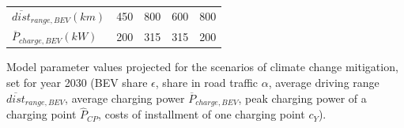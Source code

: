 \documentclass[journal,article,submit,pdftex,moreauthors]{Definitions/mdpi}
\begin{document}
\begin{table}[H]
\begin{tabularx}{\textwidth}{lCCCC}
    $\overline{dist}_{range, BEV} (km)$          & 450                                                          & 800                                                       & 600                                                           & 800                                                             \\
    $\overline{P}_{charge, BEV} (kW)$ & 200                                                          & 315                                                        & 315                                                            & 200                                                             \\ \bottomrule
    \end{tabularx}
    \end{table}
    
 
    \begin{table}[H]
    \caption{Model parameter values projected for the scenarios of climate change mitigation, set for year 2030 (BEV share $\epsilon$, share in road traffic $\alpha$, average driving range $\overline{dist}_{range, BEV}$, average charging power $\overline{P}_{charge, BEV}$, peak charging power of a charging point $\hat{P}_{CP}$, costs of installment of one charging point $c_{Y}$). \label{tab:scenario_params}}
    

\end{table}
\end{document}
